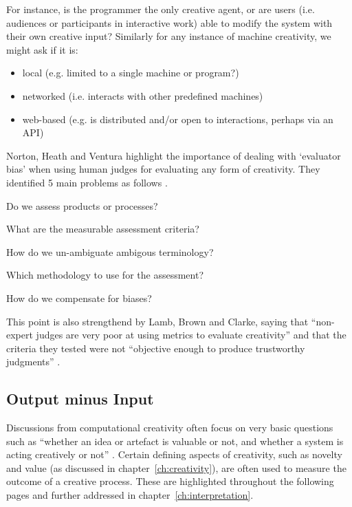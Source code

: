 For instance, is the programmer the only creative agent, or are users (i.e. audiences or participants in interactive work) able to modify the system with their own creative input? Similarly for any instance of machine creativity, we might ask if it is:

\begin{itemize}
  \item local (e.g. limited to a single machine or program?)
  \item networked (i.e. interacts with other predefined machines)
  \item web-based (e.g. is distributed and/or open to interactions, perhaps via an API)
\end{itemize}

Norton, Heath and Ventura highlight the importance of dealing with `evaluator bias' when using human judges for evaluating any form of creativity. They identified 5 main problems as follows \autocite*{Norton2015}. 

\begin{description}[leftmargin=3.5cm]
  \item[$1^{st}$ problem] Do we assess products or processes?
  \item[$2^{nd}$ problem] What are the measurable assessment criteria?
  \item[$3^{rd}$ problem] How do we un-ambiguate ambigous terminology?
  \item[$4^{th}$ problem] Which methodology to use for the assessment?
  \item[$5^{th}$ problem] How do we compensate for biases?
\end{description}

This point is also strengthend by Lamb, Brown and Clarke, saying that ``non-expert judges are very poor at using metrics to evaluate creativity'' and that the criteria they tested were not ``objective enough to produce trustworthy judgments'' \autocite*{Lamb2015}.


\subsection{Output minus Input}
\label{s:o-i}

Discussions from computational creativity often focus on very basic questions such as ``whether an idea or artefact is valuable or not, and whether a system is acting creatively or not'' \autocite{Pease2011}. Certain defining aspects of creativity, such as novelty and value (as discussed in chapter~\ref{ch:creativity}), are often used to measure the outcome of a creative process. These are highlighted throughout the following pages and further addressed in chapter~\ref{ch:interpretation}.
 
